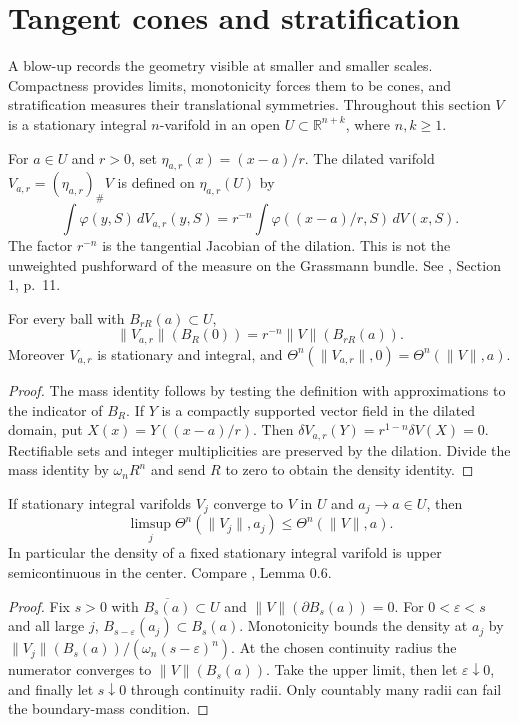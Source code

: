 \chapter{Tangent cones and stratification}\label{sec:tangent-cones-strata}
A blow-up records the geometry visible at smaller and smaller scales. Compactness provides limits, monotonicity forces them to be cones, and stratification measures their translational symmetries. Throughout this section $V$ is a stationary integral $n$-varifold in an open $U\subset\mathbb R^{n+k}$, where $n,k\geq1$.

\begin{definition}\label{def:varifold-dilation}
For $a\in U$ and $r>0$, set $\eta_{a,r}(x)=(x-a)/r$. The dilated varifold $V_{a,r}=(\eta_{a,r})_\#V$ is defined on $\eta_{a,r}(U)$ by
\[
 \int\varphi(y,S)\,dV_{a,r}(y,S)
 =r^{-n}\int\varphi((x-a)/r,S)\,dV(x,S).
\]
The factor $r^{-n}$ is the tangential Jacobian of the dilation. This is not the unweighted pushforward of the measure on the Grassmann bundle. See \cite{Minter}, Section 1, p.~11.
\end{definition}

\begin{proposition}\label{prop:varifold-scaling}
For every ball with $B_{rR}(a)\subset U$,
\[
 \|V_{a,r}\|(B_R(0))=r^{-n}\|V\|(B_{rR}(a)).
\]
Moreover $V_{a,r}$ is stationary and integral, and $\Theta^n(\|V_{a,r}\|,0)=\Theta^n(\|V\|,a)$.
\end{proposition}
\begin{proof}
The mass identity follows by testing the definition with approximations to the indicator of $B_R$. If $Y$ is a compactly supported vector field in the dilated domain, put $X(x)=Y((x-a)/r)$. Then
$\delta V_{a,r}(Y)=r^{1-n}\delta V(X)=0$.
Rectifiable sets and integer multiplicities are preserved by the dilation. Divide the mass identity by $\omega_n R^n$ and send $R$ to zero to obtain the density identity.
\end{proof}

\begin{proposition}\label{prop:density-upper-semicontinuity}
If stationary integral varifolds $V_j$ converge to $V$ in $U$ and $a_j\to a\in U$, then
\[
 \limsup_j\Theta^n(\|V_j\|,a_j)\leq\Theta^n(\|V\|,a).
\]
In particular the density of a fixed stationary integral varifold is upper semicontinuous in the center. Compare \cite{Minter}, Lemma 0.6.
\end{proposition}
\begin{proof}
Fix $s>0$ with $\overline{B_s(a)}\subset U$ and $\|V\|(\partial B_s(a))=0$. For $0<\varepsilon<s$ and all large $j$, $B_{s-\varepsilon}(a_j)\subset B_s(a)$. Monotonicity bounds the density at $a_j$ by $\|V_j\|(B_s(a))/(\omega_n(s-\varepsilon)^n)$. At the chosen continuity radius the numerator converges to $\|V\|(B_s(a))$. Take the upper limit, then let $\varepsilon\downarrow0$, and finally let $s\downarrow0$ through continuity radii. Only countably many radii can fail the boundary-mass condition.
\end{proof}

